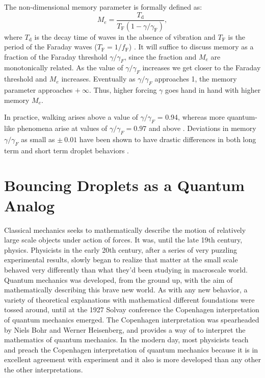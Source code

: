 The non-dimensional memory parameter is formally defined as:
$$M_e = \frac{T_\mathrm{d}}{T_\mathrm{F}(1-\gamma/\gamma_\mathrm{F})},$$
where $T_\mathrm{d}$ is the decay time of waves in the absence of vibration and $T_\mathrm{F}$ is the period of the Faraday waves ($T_\mathrm{F} = 1/f_\mathrm{F}$) . It will suffice to discuss memory as a fraction of the Faraday threshold $\gamma/\gamma_{F}$, since the fraction and $M_e$ are monotonically related. As the value of $\gamma/\gamma_{F}$ increases we get closer to the Faraday threshold and $M_e$ increases. Eventually as $\gamma/\gamma_{F}$ approaches 1, the memory parameter approaches $+~\infty$. Thus, higher forcing $\gamma$ goes hand in hand with higher memory $M_e$. 

In practice, walking arises above a value of $\gamma/\gamma_{F}$ = 0.94, whereas more quantum-like phenomena arise at values of $\gamma/\gamma_{F} = 0.97$ and above . Deviations in memory $\gamma/\gamma_{F}$ as small as $\pm~0.01$ have been shown to have drastic differences in both long term and short term droplet behaviors .
            
            
\section{Bouncing Droplets as a Quantum Analog}   

Classical mechanics seeks to mathematically describe the motion of relatively large scale objects under action of forces. It was, until the late 19th century, physics. Physicists in the early 20th century, after a series of very puzzling experimental results, slowly began to realize that matter at the small scale behaved very differently than what they'd been studying in macroscale world. Quantum mechanics was developed, from the ground up, with the aim of mathematically describing this brave new world. As with any new behavior, a variety of theoretical explanations with mathematical different foundations were tossed around, until at the 1927 Solvay conference the Copenhagen interpretation of quantum mechanics emerged. The Copenhagen interpretation was spearheaded by Niels Bohr and Werner Heisenberg, and provides a way of to interpret the mathematics of quantum mechanics. In the modern day, most physicists teach and preach the Copenhagen interpretation of quantum mechanics because it is in excellent agreement with experiment and it also is more developed than any other the other interpretations.

